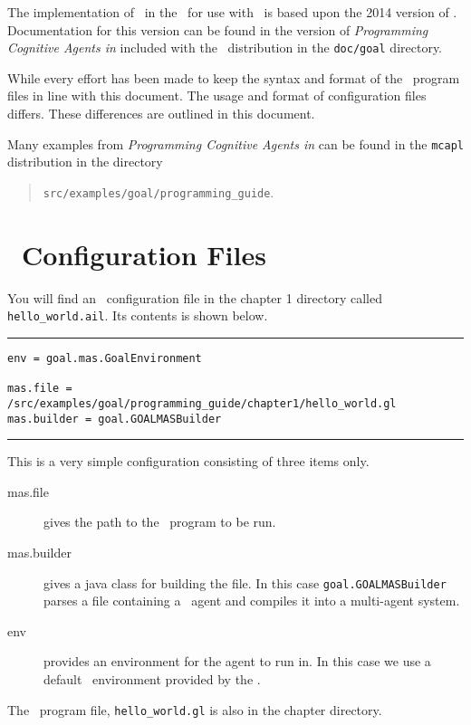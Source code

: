 The implementation of \goal\ in the \ail\ for use with \ajpf\ is based upon the 2014 version of \goal.  Documentation for this version can be found in the version of \emph{Programming Cognitive Agents in \goal} included with the \ajpf\ distribution in the \texttt{doc/goal} directory.

While every effort has been made to keep the syntax and format of the \goal\ program files in line with this document.  The usage and format of configuration files differs.  These differences are outlined in this document.

Many examples from \emph{Programming Cognitive Agents in \goal} can be found in the \texttt{mcapl} distribution in the directory
\begin{quote}
  \texttt{src/examples/goal/programming\_guide}.
\end{quote}

\section{\ail\ Configuration Files}
\label{sec:config}

\begin{sloppypar}
  You will find an \ail\ configuration file in the chapter 1 directory called \texttt{hello\_world.ail}.  Its contents is shown below.
  \end{sloppypar}

\noindent\rule{\textwidth}{1pt}
\begin{small}
\begin{verbatim}
env = goal.mas.GoalEnvironment

mas.file = /src/examples/goal/programming_guide/chapter1/hello_world.gl
mas.builder = goal.GOALMASBuilder
\end{verbatim}
\end{small}
\rule{\textwidth}{1pt}

This is a very simple configuration consisting of three items only.
\begin{sloppypar}
\begin{description}
\item[mas.file] gives the path to the \goal\ program to be run.
\item[mas.builder] gives a java class for building the file.  In this case \texttt{goal.GOALMASBuilder} parses a file containing a \goal\ agent and compiles it into a multi-agent system.
\item[env] provides an environment for the agent to run in.  In this case we use a default \goal\ environment provided by the \ail.
\end{description}
\end{sloppypar}
The \goal\ program file, \texttt{hello\_world.gl} is also in the chapter directory.

